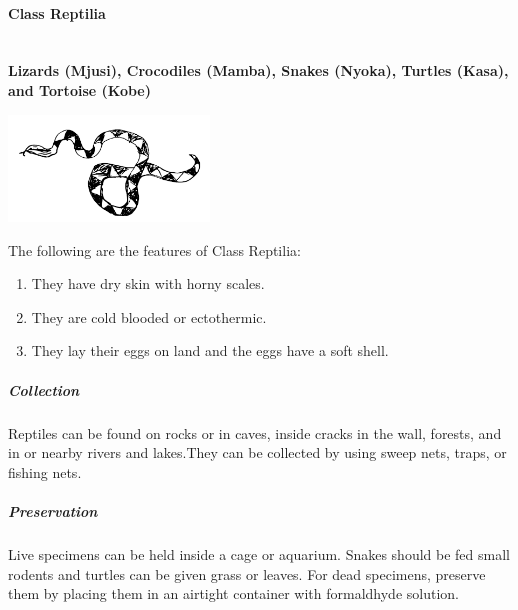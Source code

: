 \begin{multicols}{2}
%

\paragraph{Class Reptilia}\hfill \\
\textbf{Lizards (Mjusi), Crocodiles (Mamba), Snakes (Nyoka), Turtles (Kasa), and Tortoise (Kobe)}

\begin{center}
\includegraphics[width=0.4\textwidth]{./img/snake.png}
\end{center}

The following are the features of Class Reptilia:
\begin{enumerate}
\item{They have dry skin with horny scales.}
\item{They are cold blooded or ectothermic.}
\item{They lay their eggs on land and the eggs have a soft shell.}
\end{enumerate}

\subparagraph{Collection}
Reptiles can be found on rocks or in caves, inside cracks in the wall, forests, and in or nearby rivers and lakes.They can be collected by using sweep nets, traps, or fishing nets.

\subparagraph{Preservation} 
Live specimens can be held inside a cage or aquarium. Snakes should be fed small rodents and turtles can be given grass or leaves. For dead specimens, preserve them by placing them in an airtight container with formaldhyde solution.

%


\end{multicols}

